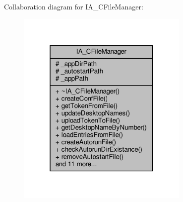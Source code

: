 Collaboration diagram for I\+A\+\_\+\+C\+File\+Manager\+:
\nopagebreak
\begin{figure}[H]
\begin{center}
\leavevmode
\includegraphics[width=235pt]{classIA__CFileManager__coll__graph}
\end{center}
\end{figure}
